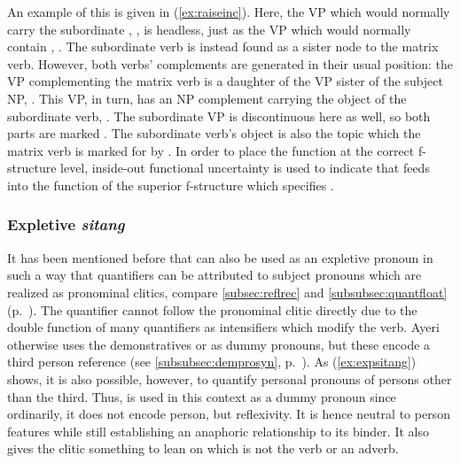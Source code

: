 An example of this is given in (\ref{ex:raiseinc}). Here, the VP which would
normally carry the subordinate , , is
headless, just as the VP which would normally contain ,
. The subordinate verb is instead found
as a sister node to the matrix verb. However, both verbs' complements are
generated in their usual position: the VP complementing the matrix verb is a
daughter of the VP sister of the subject NP, . This
VP, in turn, has an NP complement carrying the object of the subordinate verb,
. The subordinate VP is discontinuous here as well, so
both parts are marked \XCompl{}. The subordinate verb's object is also the
topic which the matrix verb is marked for by . In order to place
the \Top{} function at the correct f-structure level, inside-out functional
uncertainty is used to indicate that  feeds into the \Top{}
function of the superior f-structure which specifies \XCompl{}.

\subsubsection{Expletive \emph{sitang}}
\label{subsubsec:expsitang}

It has been mentioned before that  can also be used
as an expletive pronoun in such a way that quantifiers can be attributed to
subject pronouns which are realized as pronominal clitics, compare 
\autoref{subsec:reflrec} and \autoref{subsubsec:quantfloat}
(p.~\pageref{subsubsec:quantfloat}). The quantifier cannot follow the
pronominal clitic directly due to the double function of many quantifiers as
intensifiers which modify the verb. Ayeri otherwise uses the demonstratives 
 or  as dummy
pronouns, but these encode a third person reference (see
\autoref{subsubsec:demprosyn}, p.~\pageref{subsubsec:demprosyn}). As 
(\ref{ex:expsitang}) shows, it is also possible, however, to quantify personal
pronouns of persons other than the third. Thus,  is used in
this context as a dummy pronoun since ordinarily, it does not encode person,
but reflexivity. It is hence neutral to person features while still
establishing an anaphoric relationship to its binder. It also gives the clitic
something to lean on which is not the verb or an adverb.

